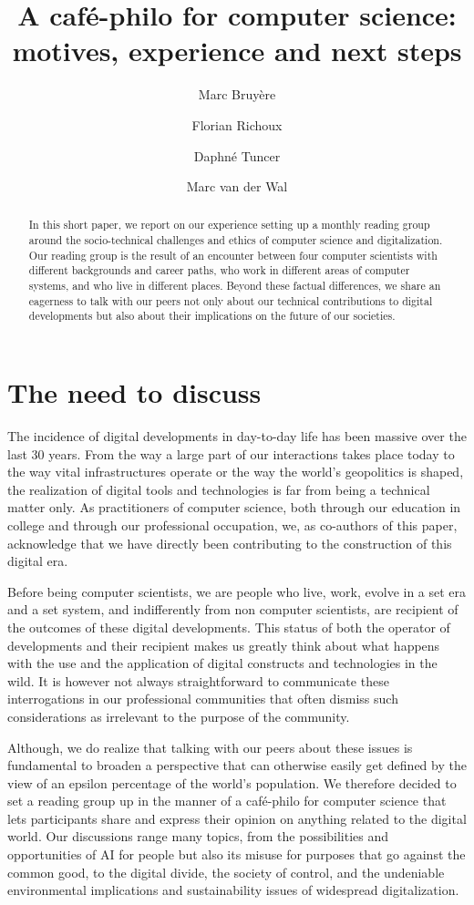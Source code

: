 \documentclass[journal]{IEEEtran}
\title{A café-philo for computer science:\\motives, experience and next steps}
\date{}
\author[1,3]{Marc Bruyère}
\author[2,3]{Florian Richoux}
\author[4]{Daphné Tuncer}
\author[5]{Marc van der Wal}
\affil[   ]{\it   marc@iij.ad.jp    \quad   florian@richoux.fr   \quad
  daphne.tuncer@enpc.fr \quad marc.vanderwal@afnic.fr}
\affil[1]{IIJ Research Lab, Japan}
\affil[2]{AIST, Japan}
\affil[3]{JFLI, CNRS, Japan}
\affil[4]{École des Ponts ParisTech, France}
\affil[5]{Afnic, France}
\begin{document}
\maketitle

\begin{abstract}
  In  this short  paper,  we report  on our  experience  setting up  a
  monthly  reading group  around  the  socio-technical challenges  and
  ethics of computer science and  digitalization. Our reading group is
  the result  of an  encounter between  four computer  scientists with
  different backgrounds and career paths,  who work in different areas
  of computer systems, and who  live in different places. Beyond these
  factual differences,  we share an  eagerness to talk with  our peers
  not only  about our technical contributions  to digital developments
  but also about their implications on the future of our societies.
\end{abstract}

\section{The need to discuss}

The  incidence of  digital developments  in day-to-day  life has  been
massive over  the last  30 years.  From the  way a  large part  of our
interactions  takes  place  today  to the  way  vital  infrastructures
operate or the way the  world’s geopolitics is shaped, the realization
of digital tools and technologies is far from being a technical matter
only. As practitioners of computer science, both through our education
in college and through our  professional occupation, we, as co-authors
of this paper, acknowledge that  we have directly been contributing to
the construction of this digital era.

Before being computer scientists, we are people who live, work, evolve
in a  set era and  a set system,  and indifferently from  non computer
scientists,   are  recipient   of  the   outcomes  of   these  digital
developments. This  status of  both the  operator of  developments and
their recipient makes us greatly think about what happens with the use
and  the application  of digital  constructs and  technologies in  the
wild. It  is however not  always straightforward to  communicate these
interrogations in our professional communities that often dismiss such
considerations as irrelevant to the purpose of the community.

Although, we do realize that talking with our peers about these issues
is fundamental to broaden a  perspective that can otherwise easily get
defined  by  the  view  of   an  epsilon  percentage  of  the  world’s
population. We  therefore decided  to set  a reading  group up  in the
manner of  a café-philo  for computer  science that  lets participants
share and  express their  opinion on anything  related to  the digital
world. Our discussions range many topics, from the possibilities and 
opportunities of AI for people but also its misuse for purposes that go 
against the common good, to the digital divide, the society of control, and 
the undeniable environmental implications and sustainability issues of widespread 
digitalization.
\end{document}

